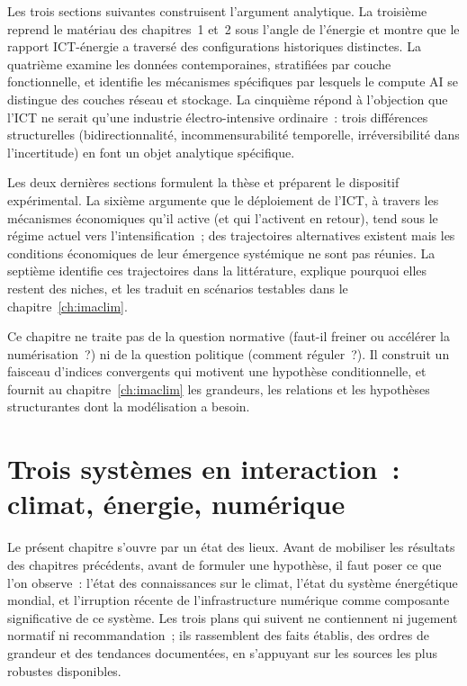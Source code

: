 Les trois sections suivantes construisent l'argument analytique. La troisième reprend le matériau des chapitres~1 et~2 sous l'angle de l'énergie et montre que le rapport ICT-énergie a traversé des configurations historiques distinctes. La quatrième examine les données contemporaines, stratifiées par couche fonctionnelle, et identifie les mécanismes spécifiques par lesquels le compute AI se distingue des couches réseau et stockage. La cinquième répond à l'objection que l'ICT ne serait qu'une industrie électro-intensive ordinaire~: trois différences structurelles (bidirectionnalité, incommensurabilité temporelle, irréversibilité dans l'incertitude) en font un objet analytique spécifique.

Les deux dernières sections formulent la thèse et préparent le dispositif expérimental. La sixième argumente que le déploiement de l'ICT, à travers les mécanismes économiques qu'il active (et qui l'activent en retour), tend sous le régime actuel vers l'intensification~; des trajectoires alternatives existent mais les conditions économiques de leur émergence systémique ne sont pas réunies. La septième identifie ces trajectoires dans la littérature, explique pourquoi elles restent des niches, et les traduit en scénarios testables dans le chapitre~\ref{ch:imaclim}.

Ce chapitre ne traite pas de la question normative (faut-il freiner ou accélérer la numérisation~?) ni de la question politique (comment réguler~?). Il construit un faisceau d'indices convergents qui motivent une hypothèse conditionnelle, et fournit au chapitre~\ref{ch:imaclim} les grandeurs, les relations et les hypothèses structurantes dont la modélisation a besoin.


\clearpage
\section{Trois systèmes en interaction~: climat, énergie, numérique}\label{sec:photographie}


Le présent chapitre s'ouvre par un état des lieux. Avant de mobiliser les résultats des chapitres précédents, avant de formuler une hypothèse, il faut poser ce que l'on observe~: l'état des connaissances sur le climat, l'état du système énergétique mondial, et l'irruption récente de l'infrastructure numérique comme composante significative de ce système. Les trois plans qui suivent ne contiennent ni jugement normatif ni recommandation~; ils rassemblent des faits établis, des ordres de grandeur et des tendances documentées, en s'appuyant sur les sources les plus robustes disponibles.



